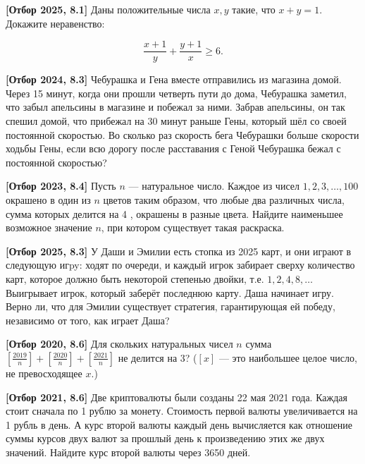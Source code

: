 \textbf{[Отбор 2025, 8.1]}
Даны положительные числа $x, y$ такие, что $x+y=1$. Докажите неравенство:

$$
\frac{x+1}{y}+\frac{y+1}{x} \geq 6 .
$$

\textbf{[Отбор 2024, 8.3]}
Чебурашка и Гена вместе отправились из магазина домой. Через 15 минут, когда они прошли четверть пути до дома, Чебурашка заметил, что забыл апельсины в магазине и побежал за ними. Забрав апельсины, он так спешил домой, что прибежал на 30 минут раньше Гены, который шёл со своей постоянной скоростью. Во сколько раз скорость бега Чебурашки больше скорости ходьбы Гены, если всю дорогу после расставания с Геной Чебурашка бежал с постоянной скоростью?

\textbf{[Отбор 2023, 8.4]}
Пусть $n$ --- натуральное число. Каждое из чисел $1,2,3, \ldots, 100$ окрашено в один из $n$ цветов таким образом, что любые два различных числа, сумма которых делится на 4 , окрашены в разные цвета. Найдите наименьшее возможное значение $n$, при котором существует такая раскраска.

\textbf{[Отбор 2025, 8.3]}
У Даши и Эмилии есть стопка из 2025 карт, и они играют в следующую игpy: ходят по очереди, и каждый игрок забирает сверху количество карт, которое должно быть некоторой степенью двойки, т.е. $1,2,4,8, \ldots$ Выигрывает игрок, который заберёт последнюю карту. Даша начинает игру. Верно ли, что для Эмилии существует стратегия, гарантирующая ей победу, независимо от того, как играет Даша?

\textbf{[Отбор 2020, 8.6]}
Для скольких натуральных чисел $n$ сумма $\left[\frac{2019}{n}\right]+\left[\frac{2020}{n}\right]+\left[\frac{2021}{n}\right]$ не делится на 3? ($[x]$ --- это наибольшее целое число, не превосходящее $x$.)

\textbf{[Отбор 2021, 8.6]}
Две криптовалюты были созданы 22 мая 2021 года. Каждая стоит сначала по 1 рублю за монету. Стоимость первой валюты увеличивается на 1 рубль в день. А курс второй валюты каждый день вычисляется как отношение суммы курсов двух валют за прошлый день к произведению этих же двух значений. Найдите курс второй валюты через 3650 дней.